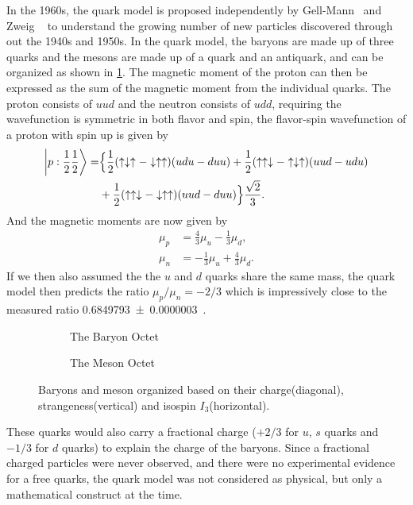 \documentclass[../main.tex]{subfiles}
\begin{document}
In the 1960s, the quark model is proposed independently by Gell-Mann~\cite{gell-mann1964} and Zweig ~\cite{zweig1964a, zweig1964}
to understand the growing number of new particles discovered through out the 1940s and 1950s.
In the quark model, the baryons are made up of three quarks and the mesons are made up
of a quark and an antiquark, and can be organized as shown in \cref{fig:Octet}.
The magnetic moment of the proton can then be expressed as the sum of the magnetic moment
from the individual quarks. The proton consists of $uud$ and the neutron consists of $udd$,
requiring the wavefunction is symmetric in both flavor and spin, the flavor-spin wavefunction of a proton with
spin up is given by
\begin{equation}
	\begin{split}
		\ket{p:\frac{1}{2} \frac{1}{2}}=&  \Bigl\{\frac{1}{2}(\uparrow\downarrow\uparrow-\downarrow\uparrow\uparrow)(udu-duu) + \frac{1}{2}(\uparrow\uparrow\downarrow-\uparrow\downarrow\uparrow)(uud-udu)\\
		&+\frac{1}{2}(\uparrow\uparrow\downarrow-\downarrow\uparrow\uparrow)(uud-duu)\Bigl\} \frac{\sqrt{2}}{3}.
	\end{split}
\end{equation}
And the magnetic moments are now given by
\begin{align}
	\mu_p & = \frac{4}{3}\mu_u-\frac{1}{3}\mu_d,  \\
	\mu_n & = -\frac{1}{3}\mu_u+\frac{4}{3}\mu_d.
\end{align}
If we then also assumed the the $u$ and $d$ quarks share the same mass, the quark model
then predicts the ratio $\mu_p/\mu_n=-2/3$ which is impressively close to the measured ratio
\num{0.6849793(3)}~\cite{workman2022}.
\begin{figure}[h!]
	\centering
	\begin{subfigure}{0.45\linewidth}
		
		\caption{The Baryon Octet}
	\end{subfigure}
	\begin{subfigure}{0.45\linewidth}
		
		\caption{The Meson Octet}
	\end{subfigure}
	\caption{Baryons and meson organized based on their charge(diagonal), strangeness(vertical) and isospin $I_3$(horizontal). }
	\label{fig:Octet}
\end{figure}
These quarks would also carry a fractional charge ($+2/3$ for $u$, $s$ quarks and $-1/3$ for $d$ quarks) to
explain the charge of the baryons. Since a fractional charged particles were never observed, and there were
no experimental evidence for a free quarks, the quark model was not considered as physical, but only a mathematical construct at the time.
\end{document}
